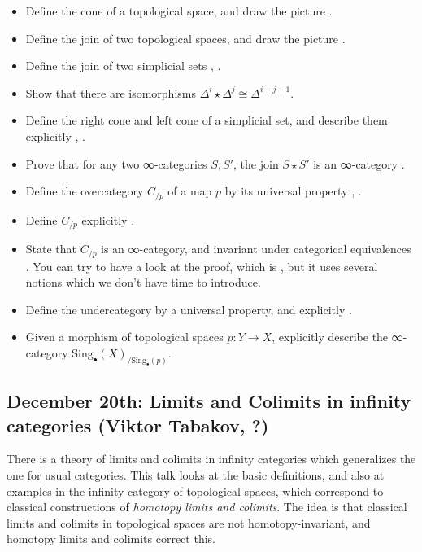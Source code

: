 \documentclass{amsart}
\theoremstyle{definition}
\theoremstyle{remark}
\begin{document}
\begin{itemize}
\item Define the cone of a topological space, and draw the picture \cite[pp.8-9]{Hat}. %
\item Define the join of two topological spaces, and draw the picture \cite[p.9]{Hat}. %
\item Define the join of two simplicial sets \cite[Def.2.11]{Groth}, \cite[Def.1.2.8.1]{HTT}. %
\item Show that there are isomorphisms $\Delta^{i} {\star} \Delta^{j} \cong \Delta^{i+j+1}$. %
\item Define the right cone and left cone of a simplicial set, and describe them explicitly \cite[Ex.2.14]{Groth}, \cite[Not.1.2.8.4]{HTT}. %
\item Prove that for any two ∞-categories $S, S'$, the join $S \star S'$ is an ∞-category \cite[Prop.1.2.8.3]{HTT}. %
\item Define the overcategory  $C_{/p}$ of a map $p$ by its universal property \cite[Prop.2.17]{Groth}, \cite[Prop.1.2.9.2]{HTT}. %
\item Define $C_{/p}$  explicitly \cite[Proof of Prop.1.2.9.2]{HTT}. %
\item State that $C_{/p}$ is an ∞-category, and invariant under categorical equivalences \cite[Prop.1.2.9.3]{HTT}. You can try to have a look at the proof, which is \cite[Cor. 2.1.2.2]{HTT}, but it uses several notions which we don't have time to introduce.
\item Define the undercategory by a universal property, and explicitly \cite[Rem.1.2.9.5]{HTT}. %
\item Given a morphism of topological spaces $p: Y \to X$, explicitly describe the ∞-category $\mathrm{Sing}_\bullet(X)_{/\mathrm{Sing}_{\bullet}(p)}$. %
\end{itemize}  

\subsection{December 20th:  Limits and Colimits in infinity categories (Viktor Tabakov, ?)}

There is a theory of limits and colimits in infinity categories which generalizes the one for usual categories. This talk looks at the basic definitions, and also at examples in the infinity-category of topological spaces, which correspond to classical constructions of \emph{homotopy limits and colimits}. The idea is that classical limits and colimits in topological spaces are not homotopy-invariant, and homotopy limits and colimits correct this.
\end{document}
